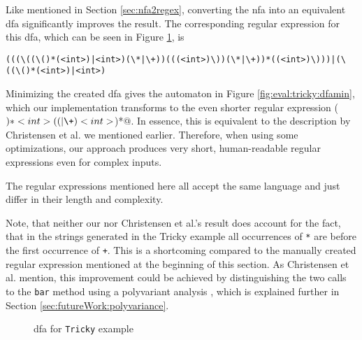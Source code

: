 Like mentioned in Section \ref{sec:nfa2regex}, converting the \ac{nfa} into an equivalent \ac{dfa} significantly improves the result. The corresponding regular expression for this \ac{dfa}, which can be seen in Figure \ref{fig:eval:tricky:dfa}, is 
\begin{Verbatim}[breaklines=true, breakanywhere=true]
(((\((\()*(<int>)|<int>)(\*|\+))(((<int>)\))(\*|\+))*((<int>)\)))|(\((\()*(<int>)|<int>)
\end{Verbatim}

Minimizing the created \ac{dfa} gives the automaton in Figure \ref{fig:eval:tricky:dfamin}, which our implementation transforms to the even shorter regular expression \Verb@(\()*<int>((\*|\+)<int>\))*@. In essence, this is equivalent to the description by Christensen et al. we mentioned earlier.
Therefore, when using some optimizations, our approach produces very short, human-readable regular expressions even for complex inputs.

The regular expressions mentioned here all accept the same language and just differ in their length and complexity. 

Note, that neither our nor Christensen et al.'s result does account for the fact, that in the strings generated in the Tricky example all occurrences of \lstinline|*| are before the first occurrence of \lstinline|+|. This is a shortcoming compared to the manually created regular expression mentioned at the beginning of this section.
As Christensen et al. mention, this improvement could be achieved by distinguishing the two calls to the \lstinline|bar| method using a polyvariant analysis \cite{brics}, which is explained further in Section \ref{sec:futureWork:polyvariance}.

\begin{figure}
	\caption{\ac{dfa} for \lstinline|Tricky| example}
	\label{fig:eval:tricky:dfa}
\end{figure}

